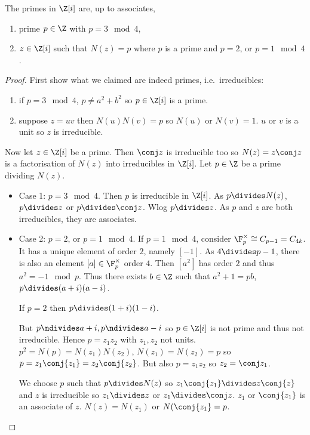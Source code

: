 \documentclass[a4paper]{article}
\theoremstyle{definition}
\begin{document}
\begin{proposition}
  The primes in \(\Z[i]\) are, up to associates,
  \begin{enumerate}
  \item prime \(p \in \Z\) with \(p = 3 \mod 4\),
  \item \(z \in \Z[i]\) such that \(N(z) = p\) where \(p\) is a prime and \(p = 2\), or \(p = 1 \mod 4\).
  \end{enumerate}
\end{proposition}

\begin{proof}
  First show what we claimed are indeed primes, i.e.\ irreducibles:
  \begin{enumerate}
  \item if \(p = 3 \mod 4\), \(p \neq a^2 + b^2\) so \(p \in \Z[i]\) is a prime.
  \item suppose \(z = uv\) then \(N(u)N(v) = p\) so \(N(u)\) or \(N(v) = 1\). \(u\) or \(v\) is a unit so \(z\) is irreducible.
  \end{enumerate}

  Now let \(z \in \Z[i]\) be a prime. Then \(\conj z\) is irreducible too so \(N(z) = z\conj z\) is a factorisation of \(N(z)\) into irreducibles in \(\Z[i]\). Let \(p \in \Z\) be a prime dividing \(N(z)\).
  \begin{itemize}
  \item Case 1: \(p = 3 \mod 4\). Then \(p\) is irreducible in \(\Z[i]\). As \(p \divides N(z)\), \(p \divides z\) or \(p \divides \conj z\). Wlog \(p \divides z\). As \(p\) and \(z\) are both irreducibles, they are associates.
  \item Case 2: \(p = 2\), or \(p = 1 \mod 4\). If \(p = 1 \mod 4\), consider \(\F_p^\times \cong C_{p - 1} = C_{4k}\). It has a unique element of order \(2\), namely \([-1]\). As \(4 \divides p - 1\), there is also an element \([a] \in \F_p^\times\) order \(4\). Then \([a^2]\) has order \(2\) and thus \(a^2 = -1 \mod p\). Thus there exists \(b \in \Z\) such that \(a^2 + 1 = pb\), \(p \divides (a + i)(a - i)\).

    If \(p = 2\) then \(p \divides (1 + i)(1 - i)\).

    But \(p \ndivides a + i, p \ndivides a - i\) so \(p \in \Z[i]\) is not prime and thus not irreducible. Hence \(p = z_1z_2\) with \(z_1, z_2\) not units. \(p^2 = N(p) = N(z_1)N(z_2)\), \(N(z_1) = N(z_2) = p\) so \(p = z_1\conj{z_1} = z_2\conj{z_2}\). But also \(p = z_1z_2\) so \(z_2 = \conj z_1\).

    We choose \(p\) such that \(p \divides N(z)\) so \(z_1\conj{z_1} \divides z \conj{z}\) and \(z\) is irreducible so \(z_1 \divides z\) or \(z_1 \divides \conj z\). \(z_1\) or \(\conj{z_1}\) is an associate of \(z\). \(N(z) = N(z_1)\) or \(N(\conj{z_1} = p\).
  \end{itemize}
\end{proof}
\end{document}
